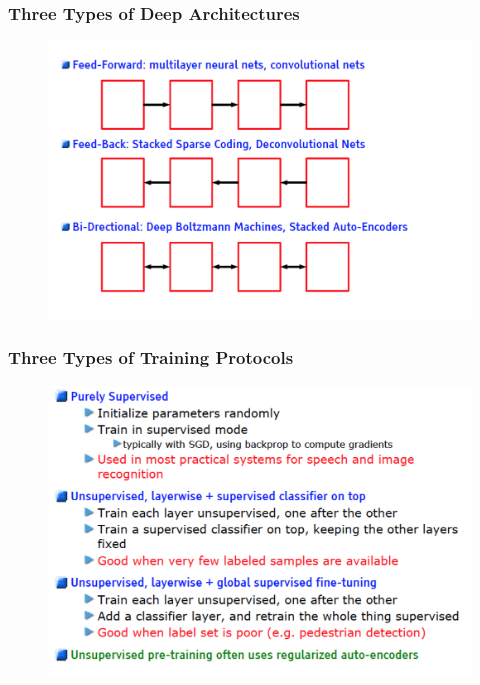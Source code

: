 \documentclass{beamer}
\begin{document}
\begin{frame}
\frametitle{Three Types of Deep Architectures}
\begin{figure}
      \includegraphics[width=1\textwidth]{figs/intro7.png}
\end{figure}
\end{frame}

\begin{frame}
\frametitle{Three Types of Training Protocols}
\begin{figure}
      \includegraphics[width=1\textwidth]{figs/intro8.png}
\end{figure}
\end{frame}
\end{document}
